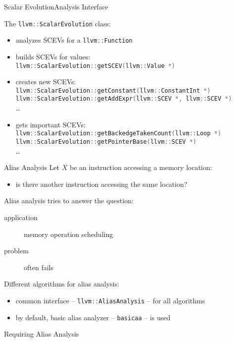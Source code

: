 \documentclass[10pt,mathserif]{beamer}
\newcommand{\cppinput}[1]{}
\newcommand{\cppinline}[1]{\lstinline[language=C++]!#1!}
\begin{document}
\begin{frame}{Scalar Evolution}{Analysis Interface}

The \cppinline{llvm::ScalarEvolution} class:

\begin{itemize}
\item analyzes SCEVs for a \cppinline{llvm::Function} 
\item builds SCEVs for values: \\
      \cppinline{llvm::ScalarEvolution::getSCEV(llvm::Value *)}
\item creates new SCEVs: \\
\cppinline{llvm::ScalarEvolution::getConstant(llvm::ConstantInt *)} \\
\cppinline{llvm::ScalarEvolution::getAddExpr(llvm::SCEV *, llvm::SCEV *)} \\
\ldots
\item gets important SCEVs: \\
      \cppinline{llvm::ScalarEvolution::getBackedgeTakenCount(llvm::Loop *)} \\
      \cppinline{llvm::ScalarEvolution::getPointerBase(llvm::SCEV *)} \\
      \ldots
\end{itemize}
\end{frame}

\begin{frame}{Alias Analysis}
Let $X$ be an instruction accessing a memory location:

\begin{itemize}
\item is there another instruction accessing the same location?
\end{itemize}

Alias analysis tries to answer the question:

\begin{description}
\item[application] memory operation scheduling
\item[problem] often fails
\end{description}

Different algorithms for alias analysis:

\begin{itemize}
\item common interface -- \cppinline{llvm::AliasAnalysis} -- for all algorithms
\item by default, basic alias analyzer -- \texttt{basicaa} -- is used
\end{itemize}

\begin{block}{Requiring Alias Analysis}
\centering
\cppinput{snippet/02/requiring-alias-analysis.cpp}
\end{block}
\end{frame}
\end{document}
